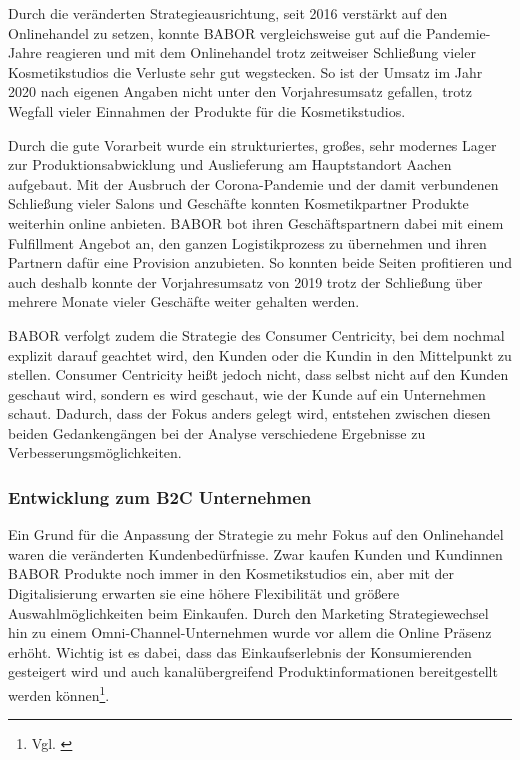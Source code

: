 Durch die veränderten Strategieausrichtung, seit 2016 verstärkt auf den Onlinehandel zu setzen, konnte BABOR vergleichsweise gut auf die Pandemie-Jahre reagieren und mit dem Onlinehandel trotz zeitweiser Schließung vieler Kosmetikstudios die Verluste sehr gut wegstecken. So ist der Umsatz im Jahr 2020 nach eigenen Angaben nicht unter den Vorjahresumsatz gefallen, trotz Wegfall vieler Einnahmen der Produkte für die Kosmetikstudios.
\newline

Durch die gute Vorarbeit wurde ein strukturiertes, großes, sehr modernes Lager zur Produktionsabwicklung und Auslieferung am Hauptstandort Aachen aufgebaut. Mit der Ausbruch der Corona-Pandemie und der damit verbundenen Schließung vieler Salons und Geschäfte konnten Kosmetikpartner Produkte weiterhin online anbieten. BABOR bot ihren Geschäftspartnern dabei mit einem Fulfillment Angebot an, den ganzen Logistikprozess zu übernehmen und ihren Partnern dafür eine Provision anzubieten. So konnten beide Seiten profitieren und auch deshalb konnte der Vorjahresumsatz von 2019 trotz der Schließung über mehrere Monate  vieler Geschäfte weiter gehalten werden.
\newline

BABOR verfolgt zudem die Strategie des Consumer Centricity, bei dem nochmal explizit darauf geachtet wird, den Kunden oder die Kundin in den Mittelpunkt zu stellen. Consumer Centricity heißt jedoch nicht, dass selbst nicht auf den Kunden geschaut wird, sondern es wird geschaut, wie der Kunde auf ein Unternehmen schaut. Dadurch, dass der Fokus anders gelegt wird, entstehen zwischen diesen beiden Gedankengängen bei der Analyse verschiedene Ergebnisse zu Verbesserungsmöglichkeiten.

\subsubsection{Entwicklung zum B2C Unternehmen}\label{unterabschnitt_4_2_1}
Ein Grund für die Anpassung der Strategie zu mehr Fokus auf den Onlinehandel waren die veränderten Kundenbedürfnisse. Zwar kaufen Kunden und Kundinnen BABOR Produkte noch immer in den Kosmetikstudios ein, aber mit der Digitalisierung erwarten sie eine höhere Flexibilität und größere Auswahlmöglichkeiten beim Einkaufen. Durch den Marketing Strategiewechsel hin zu einem Omni-Channel-Unternehmen wurde vor allem die Online Präsenz erhöht. Wichtig ist es dabei, dass das Einkaufserlebnis der Konsumierenden gesteigert wird und auch kanalübergreifend Produktinformationen bereitgestellt werden können\footnote{Vgl. \autocite [Online] {Digitalhub2022}}.
\newline

